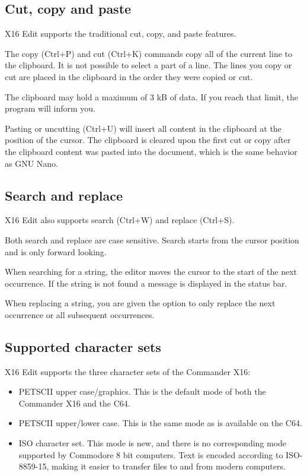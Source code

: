 \documentclass{article}
\begin{document}
    \subsection{Cut, copy and paste}

        X16 Edit supports the traditional cut, copy, and paste features.

        The copy (Ctrl+P) and cut (Ctrl+K) commands copy all of the current line to the clipboard. It is not possible to select 
        a part of a line. The lines you copy or cut are placed in the clipboard in the order they were copied or cut.
        
        The clipboard may hold a maximum of 3 kB of data. If you reach that limit, the program will inform you.

        Pasting or uncutting (Ctrl+U) will insert all content in the clipboard at the position of the cursor. The clipboard
        is cleared upon the first cut or copy after the clipboard content was pasted into the document, which is the
        same behavior as GNU Nano.

    \subsection{Search and replace}

        X16 Edit also supports search (Ctrl+W) and replace (Ctrl+S).

        Both search and replace are case sensitive. Search starts from the
        cursor position and is only forward looking.

        When searching for a string, the editor moves the cursor to the start
        of the next occurrence. If the string is not found a message is
        displayed in the status bar.

        When replacing a string, you are given the option to only replace the
        next occurrence or all subsequent occurrences.

    \subsection{Supported character sets}

        X16 Edit supports the three character sets of the Commander X16:

        \begin{itemize}
            \item PETSCII upper case/graphics. This is the default mode of both the Commander X16 and the C64.

            \item PETSCII upper/lower case. This is the same mode as is available on the C64.

            \item ISO character set. This mode is new, and there is no corresponding mode supported by 
            Commodore 8 bit computers. Text is encoded according to ISO-8859-15, making it
            easier to transfer files to and from modern computers.
        \end{itemize}
\end{document}
